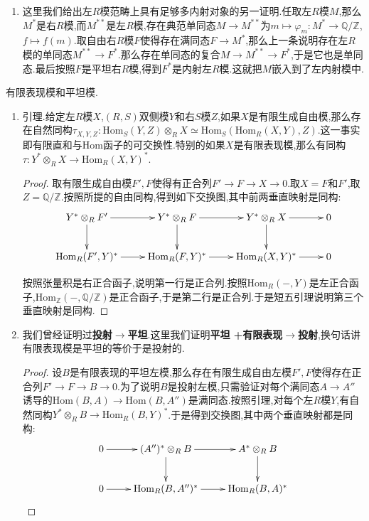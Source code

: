 \begin{enumerate}
\begin{proof}
    	于是第一行的正合性传递给第三行,这就得到正合列正合列$0\to B\otimes_RA'\to B\otimes_RA$,于是$B$是平坦模.
    \end{proof}
    \item 这里我们给出左$R$模范畴上具有足够多内射对象的另一证明.任取左$R$模$M$,那么$M^*$是右$R$模,而$M^{**}$是左$R$模,存在典范单同态$M\to M^{**}$为$m\mapsto\varphi_m:M^*\to\mathbb{Q}/\mathbb{Z}$,$f\mapsto f(m)$.取自由右$R$模$F$使得存在满同态$F\to M^*$,那么上一条说明存在左$R$模的单同态$M^{**}\to F^*$.那么存在单同态的复合$M\to M^{**}\to F^*$,于是它也是单同态.最后按照$F$是平坦右$R$模,得到$F^*$是内射左$R$模.这就把$M$嵌入到了左内射模中.
\end{enumerate}

有限表现模和平坦模.
\begin{enumerate}
	\item 引理.给定左$R$模$X$,$(R,S)$双侧模$Y$和右$S$模$Z$,如果$X$是有限生成自由模,那么存在自然同构$\tau_{X,Y,Z}:\mathrm{Hom}_S(Y,Z)\otimes_RX\simeq\mathrm{Hom}_S(\mathrm{Hom}_R(X,Y),Z)$.这一事实即有限直和与Hom函子的可交换性.特别的如果$X$是有限表现模,那么有同构$\tau:Y^*\otimes_RX\to\mathrm{Hom}_R(X,Y)^*$.
	\begin{proof}
		
		取有限生成自由模$F',F$使得有正合列$F'\to F\to X\to0$.取$X=F$和$F'$,取$Z=\mathbb{Q}/\mathbb{Z}$.按照所提的自由同构,得到如下交换图,其中前两垂直映射是同构:
		$$\xymatrix{Y^*\otimes_RF'\ar[d]\ar[r]&Y^*\otimes_RF\ar[d]\ar[r]&Y^*\otimes_RX\ar[r]\ar[d]&0\\\mathrm{Hom}_R(F',Y)^*\ar[r]&\mathrm{Hom}_R(F,Y)^*\ar[r]&\mathrm{Hom}_R(X,Y)^*\ar[r]&0}$$
		
		按照张量积是右正合函子,说明第一行是正合列.按照$\mathrm{Hom}_R(-,Y)$是左正合函子,$\mathrm{Hom}_{\mathbb{Z}}(-,\mathbb{Q}/\mathbb{Z})$是正合函子,于是第二行是正合列.于是短五引理说明第三个垂直映射是同构.
	\end{proof}
	\item 我们曾经证明过\textbf{投射$\rightarrow$平坦}.这里我们证明\textbf{平坦 +有限表现$\rightarrow$投射},换句话讲有限表现模是平坦的等价于是投射的.
	\begin{proof}
		
		设$B$是有限表现的平坦左模,那么存在有限生成自由左模$F',F$使得存在正合列$F'\to F\to B\to0$.为了说明$B$是投射左模,只需验证对每个满同态$A\to A''$诱导的$\mathrm{Hom}(B,A)\to\mathrm{Hom}(B,A'')$是满同态.按照引理,对每个左$R$模$Y$,有自然同构$Y^*\otimes_RB\to\mathrm{Hom}_R(B,Y)^*$.于是得到交换图,其中两个垂直映射都是同构:
		$$\xymatrix{0\ar[r]&(A'')^*\otimes_RB\ar[r]\ar[d]&A^*\otimes_RB\ar[d]\\0\ar[r]&\mathrm{Hom}_R(B,A'')^*\ar[r]&\mathrm{Hom}_R(B,A)^*}$$
		

\end{proof}
\end{enumerate}
